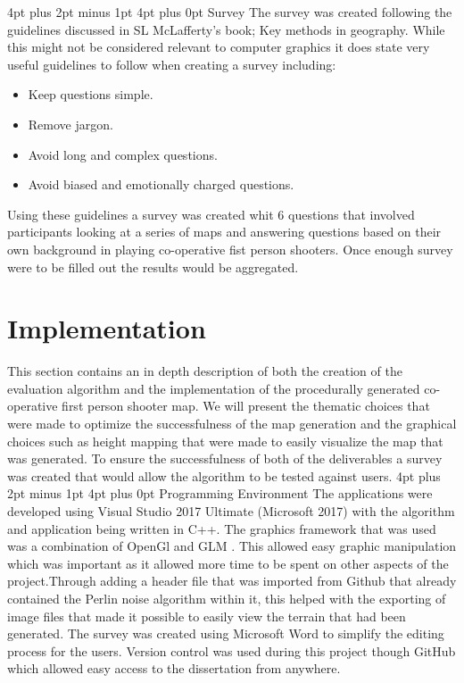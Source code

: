 \documentclass[12pt,a4paper,oneside]{book}
\makeatletter
\renewcommand\section{\@startsection {section}{1}{0mm} %
                               {4pt plus 2pt minus 1pt} %
                               {4pt plus 0pt} %
                               {\bfseries}}
\makeatother
\begin{document}
\section{Survey}
The survey was created following the guidelines discussed in SL McLafferty's book; Key methods in geography\cite{Geog}. While this might not be considered relevant to computer graphics it does state very useful guidelines to follow when creating a survey including:
\begin{itemize}
\item Keep questions simple.
\item Remove jargon.
\item Avoid long and complex questions.
\item Avoid biased and emotionally charged questions.
\end{itemize}
Using these guidelines a survey was created whit 6 questions that involved participants looking at a series of maps and answering questions based on their own background in playing co-operative fist person shooters. Once enough survey were to be filled out the results would be aggregated.    
\chapter{Implementation}
This section contains an in depth description of both the creation of the evaluation algorithm and the implementation of the procedurally generated co-operative first person shooter map. We will present the thematic choices that were made to optimize the successfulness of the map generation and the graphical choices such as height mapping that were made to easily visualize the map that was generated. To ensure the successfulness of both of the deliverables a survey was created that would allow the algorithm to be tested against users.
\vspace{5mm} 
\newline
\section{Programming Environment}
The applications were developed using Visual Studio 2017 Ultimate (Microsoft
2017) with the algorithm and application being written in C++. The graphics framework that was used was a combination of OpenGl and GLM \cite{OpenGL}. This allowed easy graphic manipulation which was important as it allowed more time to be spent on other aspects of the project.Through adding a header file that was imported from Github that already contained the Perlin noise algorithm within it, this helped with the exporting of image files that made it possible to easily view the terrain that had been generated. The survey was created using Microsoft Word to simplify the editing process for the users.  Version control was used during this project though GitHub which allowed easy access to the dissertation from anywhere.
\vspace{5mm} 
\newline
\end{document}
